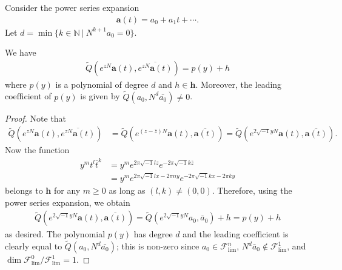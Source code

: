 Consider the power series expansion
\begin{eqnarray*}
\mathbf{a}(t)=a_{0}+a_{1}t+\cdots.
\end{eqnarray*}
 Let 
\(d=\min\{k\in\mathbb{N}~|~N^{k+1}a_{0}=0\}\).

\begin{lemma}
We have
\begin{eqnarray*}
\tilde{Q}(e^{zN}\mathbf{a}(t),\overline{e^{zN}\mathbf{a}(t)})=p(y)+h
\end{eqnarray*}
where \(p(y)\) is a polynomial of degree \(d\) and \(h\in\mathbf{h}\).
Moreover, the leading coefficient of \(p(y)\) is given by
\(\tilde{Q}(a_{0},N^{d}\bar{a_{0}})\ne 0\).
\end{lemma}
\begin{proof}
Note that
\begin{align*}
\tilde{Q}(e^{zN}\mathbf{a}(t),\overline{e^{zN}\mathbf{a}(t)})
&=\tilde{Q}(e^{(z-\bar{z})N}\mathbf{a}(t),\overline{\mathbf{a}(t)})=
\tilde{Q}(e^{2\sqrt{-1}y N}\mathbf{a}(t),\overline{\mathbf{a}(t)}).
\end{align*}
Now the function 
\begin{align*}
y^{m}t^{l}\bar{t}^{k}&=
y^{m}e^{2\pi\sqrt{-1}lz}e^{-2\pi\sqrt{-1}k\bar{z}}\\
&=y^{m}e^{2\pi\sqrt{-1}lx-2\pi ny}e^{-2\pi\sqrt{-1}kx-2\pi ky}
\end{align*} 
belongs to \(\mathbf{h}\) for any \(m\ge 0\) 
as long as \((l,k)\ne (0,0)\). 
Therefore, using the power series expansion,
we obtain 
\begin{align*}
\tilde{Q}(e^{2\sqrt{-1}y N}\mathbf{a}(t),\overline{\mathbf{a}(t)}) = 
\tilde{Q}(e^{2\sqrt{-1}y N}a_{0},\overline{a}_{0}) + h = p(y) + h
\end{align*}
as desired. The polynomial \(p(y)\) has degree \(d\) and the 
leading coefficient is clearly equal to 
\(\tilde{Q}(a_{0},N^{d}\bar{a_{0}})\); this is non-zero since
\(a_{0}\in\mathcal{F}^{n}_{\mathrm{lim}}\),
\(N^{d}\bar{a}_{0}\notin \mathcal{F}^{1}_{\mathrm{lim}}\), and 
\(\dim \mathcal{F}^{0}_{\mathrm{lim}}\slash \mathcal{F}^{1}_{\mathrm{lim}}=1\).
\end{proof}


